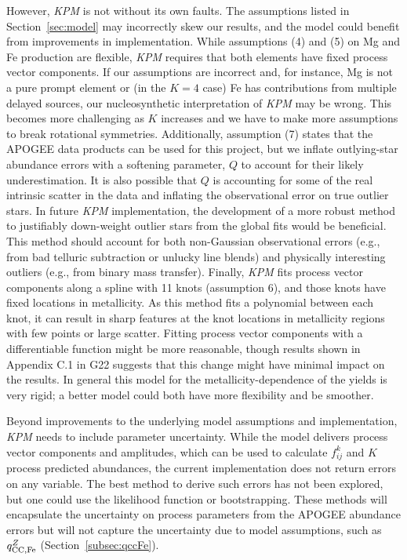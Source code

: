 \documentclass[modern, linenumbers]{aastex631}
\newcommand{\qccFe}{q_{{\rm CC, Fe}}^{Z}}
\newcommand{\name}{\textsl{KPM}}
\begin{document}
However, \name{} is not without its own faults. The assumptions listed in Section~\ref{sec:model} may incorrectly skew our results, and the model could benefit from improvements in implementation. While assumptions (4) and (5) on Mg and Fe production are flexible, \name{} requires that both elements have fixed process vector components. If our assumptions are incorrect and, for instance, Mg is not a pure prompt element or (in the $K=4$ case) Fe has contributions from multiple delayed sources, our nucleosynthetic interpretation of \name{} may be wrong. This becomes more challenging as $K$ increases and we have to make more assumptions to break rotational symmetries. Additionally, assumption (7) states that the APOGEE data products can be used for this project, but we inflate outlying-star abundance errors with a softening parameter, $Q$ to account for their likely underestimation. It is also possible that $Q$ is accounting for some of the real intrinsic scatter in the data and inflating the observational error on true outlier stars. In future \name{} implementation, the development of a more robust method to justifiably down-weight outlier stars from the global fits would be beneficial. This method should account for both non-Gaussian observational errors (e.g., from bad telluric subtraction or unlucky line blends) and physically interesting outliers (e.g., from binary mass transfer).
Finally, \name{} fits process vector components along a spline with 11 knots (assumption 6), and those knots have fixed locations in metallicity.
As this method fits a polynomial between each knot, it can result in sharp features at the knot locations in metallicity regions with few points or large scatter. Fitting process vector components with a differentiable function might be more reasonable, though results shown in Appendix C.1 in G22 suggests that this change might have minimal impact on the results. 
In general this model for the metallicity-dependence of the yields is very rigid; a better model could both have more flexibility and be smoother.

Beyond improvements to the underlying model assumptions and implementation, \name{} needs to include parameter uncertainty. While the model delivers process vector components and amplitudes, which can be used to calculate $f^{k}_{ij}$ and $K$ process predicted abundances, the current implementation does not return errors on any variable. The best method to derive such errors has not been explored, but one could use the likelihood function or bootstrapping. These methods will encapsulate the uncertainty on process parameters from the APOGEE abundance errors but will not capture the uncertainty due to model assumptions, such as $\qccFe$ (Section~\ref{subsec:qccFe}). 
\end{document}
